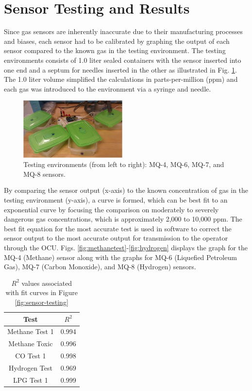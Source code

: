 \section{Sensor Testing and Results}\label{sec:results}

Since gas sensors are inherently inaccurate due to their manufacturing processes and biases, each sensor had to be calibrated by graphing the output of each sensor compared to the known gas in the testing environment. The testing environments consists of 1.0 liter sealed containers with the sensor inserted into one end and a septum for needles inserted in the other as illustrated in Fig. \ref{fig:sensor}. The 1.0 liter volume simplified the calculations in parts-per-million (ppm) and each gas was introduced to the environment via a syringe and needle.

\begin{figure}
	\centering
	\includegraphics[width=0.48\textwidth]{./pictures/sensor.jpg}
	\caption{Testing environments (from left to right): MQ-4, MQ-6, MQ-7, and MQ-8 sensors.}
	\label{fig:sensor}
\end{figure}

By comparing the sensor output (x-axis) to the known concentration of gas in the testing environment (y-axis), a curve is formed, which can be best fit to an exponential curve by focusing the comparison on moderately to severely dangerous gas concentrations, which is approximately 2,000 to 10,000 ppm. The best fit equation for the most accurate test is used in software to correct the sensor output to the most accurate output for transmission to the operator through the OCU. Figs. \ref{fig:methanetest}-\ref{fig:hydrogen} displays the graph for the MQ-4 (Methane) sensor along with the graphs for MQ-6 (Liquefied Petroleum Gas), MQ-7 (Carbon Monoxide), and MQ-8 (Hydrogen) sensors.

\begin{table}
\centering
\caption{\(R^2\) values associated with fit curves in Figure \ref{fig:sensor-testing} }
\begin{tabular}{c||c}
Test & \(R^2\) \\ \hline \hline
Methane Test 1 & 0.994 \\ \hline
Methane Toxic & 0.996 \\ \hline
CO Test 1 & 0.998 \\ \hline
Hydrogen Test & 0.969 \\ \hline
LPG Test 1 & 0.999

\end{tabular}
\end{table}


